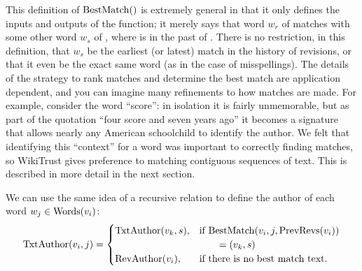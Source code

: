 This definition of $\mathrm{BestMatch}()$ is extremely general in that it only
defines the inputs and outputs of the function; it merely
says that word $w_r$ of  matches with some other word $w_s$
of , where  is in the past of .
There is no restriction, in this definition, that $w_s$ be the earliest
(or latest) match in the history of revisions, or that it even be
the exact same word (as in the case of misspellings).
The details of the strategy to rank matches and determine the best match
are application dependent, and you can imagine many refinements to how
matches are made.
For example, consider the word ``score'': in isolation it is fairly
unmemorable, but as part of the quotation ``four score and seven years
ago'' it becomes a signature that allows nearly any American
schoolchild to identify the author.
We felt that identifying this ``context'' for a word was important to
correctly finding matches, so WikiTrust gives preference to matching
contiguous sequences of text.
This is described in more detail in the next section.

We can use the same idea of a recursive relation to define
the author of each word $w_j \in \mathrm{Words}(v_{i})$:
\begin{equation}
\txtauthor{\version{i}, j} =
    \begin{cases}
	\txtauthor{\version{k}, s}, & \text{if }
	\match{\version{i}, j, \prevrevs{\version{i}}} \\
                                    & \qquad = (\version{k}, s) \\
	\revauthor{\version{i}}, & \text{if there is no best match text. } \\
    \end{cases}
\label{def:txtauthor}
\end{equation}

